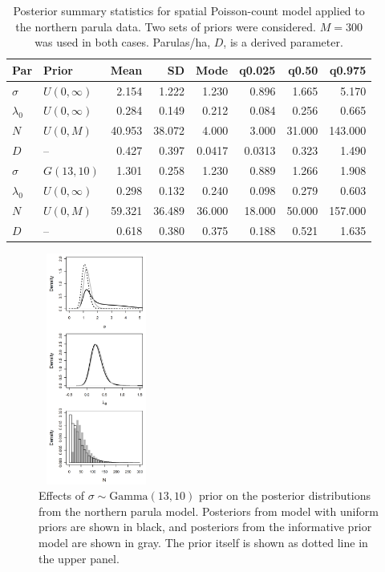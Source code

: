 \begin{table}%
  \caption{Posterior summary statistics for spatial Poisson-count
    model applied to the northern parula data. Two sets of priors were
    considered. $M=300$ was used in both cases. Parulas/ha, $D$, is a
    derived parameter.}
  \scriptsize
  \begin{tabular}{l l rrrrrr}
    \hline
    Par        & Prior                  & Mean  & SD    & Mode   & q0.025  & q0.50  & q0.975  \\
    \hline
    $\sigma$   & $U(0, \infty)$   & 2.154   & 1.222  & 1.230   & 0.896   & 1.665   & 5.170    \\
    $\lambda_0$ & $U(0, \infty)$  & 0.284   & 0.149 & 0.212    & 0.084  & 0.256  & 0.665   \\
    $N$        & $U(0, M)$             & 40.953   & 38.072  & 4.000  & 3.000       & 31.000     & 143.000     \\
    $D$        &  --                   & 0.427    & 0.397 & 0.0417   & 0.0313  & 0.323  & 1.490    \\
    \hline
    $\sigma$    & $G(13, 10)$          & 1.301    & 0.258 & 1.230    & 0.889   & 1.266   & 1.908    \\
    $\lambda_0$ & $U(0, \infty)$ & 0.298    & 0.132 & 0.240    & 0.098   & 0.279  & 0.603   \\
    $N$         & $U(0, M)$            & 59.321   & 36.489  & 36.000 & 18.000      & 50.000     & 157.000     \\
    $D$         &  --                  & 0.618    & 0.380 & 0.375   & 0.188   & 0.521  & 1.635    \\
    \hline
  \end{tabular}
  \label{t:nopaPosts}
\vspace{0.5cm}
\end{table}



\begin{figure}
  \centering
  \includegraphics[width=1.5in,height=3in]{Ch18-Unmarked/figs/prior} %
  \caption{Effects of $\sigma \sim \mbox{Gamma}(13,10)$
    prior on the posterior distributions from the northern parula
    model. Posteriors from model with uniform priors are
    shown in black, and posteriors from the informative prior model
    are shown in gray. The prior itself is shown as dotted line in the
    upper panel.}
  \label{fig:prior}
\end{figure}




